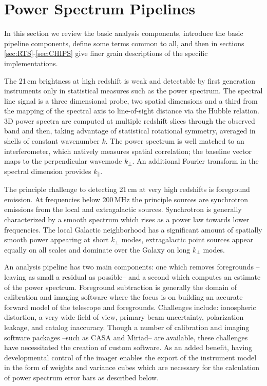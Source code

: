 \documentclass[twolcolumn,iop]{emulateapj}
\begin{document}
\section{Power Spectrum Pipelines}
\label{sec:pipelines}
In this section we review the basic analysis components, introduce the basic pipeline components, define some terms common to all, and then in sections \ref{sec:RTS}-\ref{sec:CHIPS} give finer grain descriptions of the specific implementations.

The 21\,cm brightness at high redshift is weak and detectable by first generation instruments only in	 statistical measures such as the power spectrum. The spectral line signal is a three dimensional probe, two spatial dimensions and a third from the mapping of the spectral axis to line-of-sight distance via the Hubble relation. 3D power spectra are computed at multiple redshift slices through the observed band and then, taking advantage of statistical rotational symmetry, averaged in shells of constant wavenumber $k$.  The power spectrum is well matched to an interferometer, which natively measures spatial correlation; the baseline vector maps to the perpendicular wavemode $k_\perp$.  An additional Fourier transform in the spectral dimension provides $k_\parallel$.  

The principle challenge to detecting 21\,cm at very high redshifts is foreground emission. At frequencies below 200\,MHz the principle sources are synchrotron emissions from the local and extragalactic sources. Synchrotron is generally characterized by a smooth spectrum which rises as a power law towards lower frequencies. The local Galactic neighborhood has a significant amount of spatially smooth power appearing at short $k_\perp$ modes, extragalactic point sources appear equally on all scales and dominate over the Galaxy on long $k_\perp$ modes.

An analysis pipeline has two main components: one which removes foregrounds --leaving as small a residual as possible-- and a second which computes an estimate of the power spectrum.   Foreground subtraction is generally the domain of calibration and imaging software where the focus is on building an accurate forward model of the telescope and foregrounds.  Challenges include: ionospheric distortion, a very wide field of view, primary beam uncertainty, polarization leakage, and catalog inaccuracy. Though a number of calibration and imaging software packages --such as CASA and Miriad-- are available, these challenges have necessitated the creation of custom software.  As an added benefit, having developmental control of the imager enables the export of the instrument model in the form of weights and variance cubes which are necessary for the calculation of power spectrum error bars as described below. 
\end{document}
